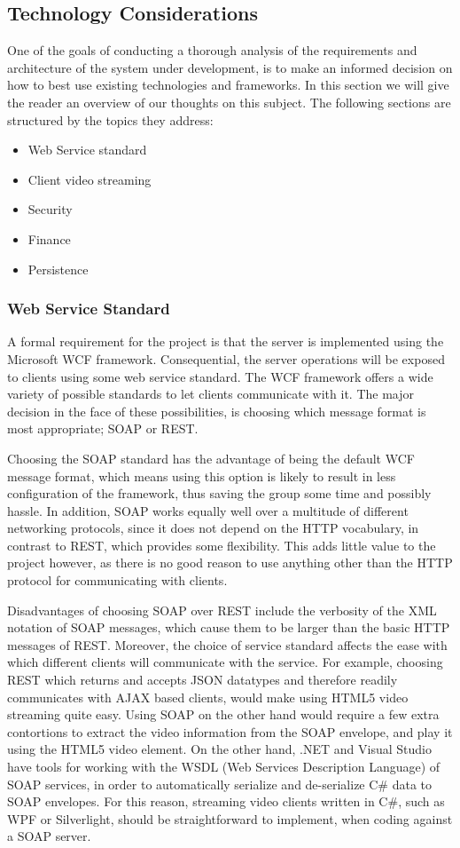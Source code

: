 \subsection{Technology Considerations}
One of the goals of conducting a thorough analysis of the requirements and architecture of the system under development, is to make an informed decision on how to best use existing technologies and frameworks. In this section we will give the reader an overview of our thoughts on this subject. The following sections are structured by the topics they address:
\begin{itemize}
\item Web Service standard
\item Client video streaming
\item Security
\item Finance
\item Persistence
\end{itemize}

\subsubsection{Web Service Standard}
A formal requirement for the project is that the server is implemented using the Microsoft WCF framework. Consequential, the server operations will be exposed to clients using some web service standard. The WCF framework offers a wide variety of possible standards to let clients communicate with it. The major decision in the face of these possibilities, is choosing which message format is most appropriate; SOAP or REST.

Choosing the SOAP standard has the advantage of being the default WCF message format, which means using this option is likely to result in less configuration of the framework, thus saving the group some time and possibly hassle. In addition, SOAP works equally well over a multitude of different networking protocols, since it does not depend on the HTTP vocabulary, in contrast to REST, which provides some flexibility. This adds little value to the project however, as there is no good reason to use anything other than the HTTP protocol for communicating with clients.

Disadvantages of choosing SOAP over REST include the verbosity of the XML notation of SOAP messages, which cause them to be larger than the basic HTTP messages of REST. Moreover, the choice of service standard affects the ease with which different clients will communicate with the service. For example, choosing REST which returns and accepts JSON datatypes and therefore readily communicates with AJAX based clients, would make using  HTML5 video streaming quite easy. Using SOAP on the other hand would require a few extra contortions to extract the video information from the SOAP envelope, and play it using the HTML5 video element. On the other hand, .NET and Visual Studio have tools for working with the WSDL (Web Services Description Language) of SOAP services, in order to automatically serialize and de-serialize C\# data to SOAP envelopes. For this reason, streaming video clients written in C\#, such as WPF or Silverlight, should be straightforward to implement, when coding against a SOAP server.


